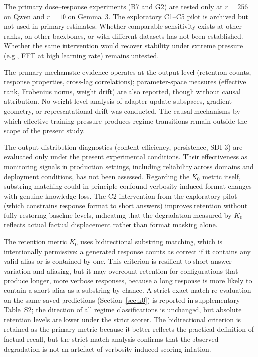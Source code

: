 \documentclass[a4paper,fleqn]{cas-dc}
\newif\ifshowchanges
\newcommand{\rev}[1]{\ifshowchanges{\color{blue}#1}\else{#1}\fi}
\begin{document}
\rev{The primary dose--response experiments (B7 and G2) are tested only at $r=256$ on Qwen and $r=10$ on Gemma~3. The exploratory C1--C5 pilot is archived but not used in primary estimates.}
\rev{Whether comparable sensitivity exists at other ranks, on other backbones, or with different datasets has not been established.} Whether the same
intervention would recover stability under extreme pressure (e.g., FFT at high
learning rate) remains untested.

\rev{The primary mechanistic evidence operates at the output level (retention counts, response
properties, cross-lag correlations); parameter-space measures (effective rank, Frobenius norms, weight drift) are also reported, though without causal attribution.} No weight-level analysis of adapter update
subspaces, gradient geometry, or representational drift was conducted. The causal
mechanisms by which effective training pressure produces regime transitions
remain outside the scope of the present study.

The output-distribution diagnostics (content efficiency, persistence, SDI-3) are
evaluated only under the present experimental conditions. Their effectiveness as
monitoring signals in production settings, including reliability across domains
and deployment conditions, has not been assessed. Regarding the $K_0$ metric
itself, substring matching could in principle confound verbosity-induced format
changes with genuine knowledge loss. \rev{The C2 intervention from the exploratory pilot (which
constrains response format to short answers) improves retention without fully
restoring baseline levels, indicating that the degradation measured by $K_0$
reflects actual factual displacement rather than format masking alone.}

\rev{The retention metric $K_0$ uses bidirectional substring matching, which
is intentionally permissive: a generated response counts as correct if it
contains any valid alias or is contained by one. This criterion is resilient to
short-answer variation and aliasing, but it may overcount retention for
configurations that produce longer, more verbose responses, because a long
response is more likely to contain a short alias as a substring by chance.
A strict exact-match re-evaluation on the same saved predictions
(Section~\ref{sec:k0}) is reported in supplementary Table~S2; the direction of
all regime classifications is unchanged, but absolute retention levels are
lower under the strict scorer. The bidirectional criterion is retained as the
primary metric because it better reflects the practical definition of factual
recall, but the strict-match analysis confirms that the observed degradation
is not an artefact of verbosity-induced scoring inflation.}
\end{document}
